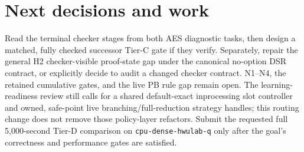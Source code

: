 \documentclass[10pt]{article}
\begin{document}
\section*{Next decisions and work}
Read the terminal checker stages from both AES diagnostic tasks, then design
a matched, fully checked successor Tier-C gate if they verify. Separately,
repair the general H2 checker-visible proof-state gap under the canonical
no-option DSR contract, or explicitly decide to audit a changed checker
contract. N1--N4, the retained cumulative gates, and the live PB rule gap
remain open. The learning-readiness review still calls for a shared
default-exact inprocessing slot controller and owned, safe-point live
branching/full-reduction strategy handles; this routing change does not
remove those policy-layer refactors. Submit the requested full 5,000-second
Tier-D comparison on \texttt{cpu-dense-hwulab-q} only after the goal's
correctness and performance gates are satisfied.
\end{document}

